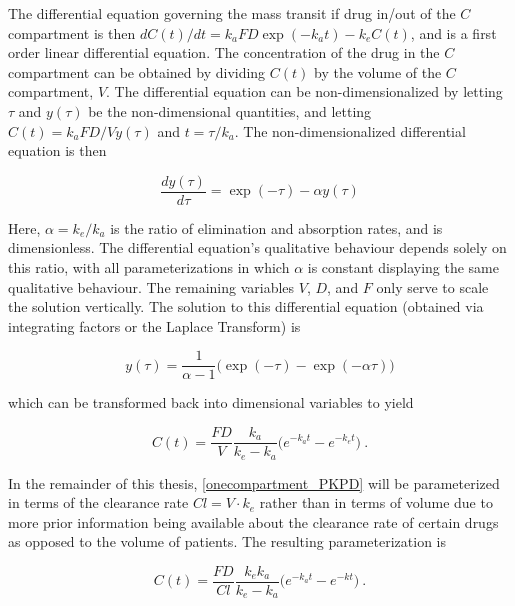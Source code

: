 The differential equation governing the mass transit if drug in/out of the $C$ compartment is then $dC(t)/dt = k_aFD\exp(-k_a t) - k_eC(t)$, and is a first order linear differential equation.  The concentration of the drug in the $C$ compartment can be obtained by dividing $C(t)$ by the volume of the $C$ compartment, $V$.  The differential equation can be non-dimensionalized by letting $\tau$ and $y(\tau)$ be the non-dimensional quantities, and letting $C(t) = k_a FD/V y(\tau)$ and $t = \tau/k_a$.  The non-dimensionalized differential equation is then

\begin{equation}
	\dfrac{dy(\tau)}{d\tau} = \exp(-\tau) - \alpha y(\tau)
\end{equation}

\noindent Here, $\alpha = k_e / k_a$ is the ratio of elimination and absorption rates, and is dimensionless.  The differential equation's qualitative behaviour depends solely on this ratio, with all parameterizations in which $\alpha$ is constant displaying the same qualitative behaviour.  The remaining variables $V$, $D$, and $F$ only serve to scale the solution vertically.  The solution to this differential equation (obtained via integrating factors or the Laplace Transform) is

\begin{equation}\label{key}
	y(\tau) = \dfrac{1}{\alpha -1} \Big( \exp(-\tau) - \exp(-\alpha \tau) \Big)
\end{equation}

\noindent which can be transformed back into dimensional variables to yield

\begin{equation}\label{onecompartment_PKPD}
	C(t) = \dfrac{F D}{V}\dfrac{k_a}{k_e - k_a}\Big(e^{-k_at} - e^{-k_et}\Big) \>.
\end{equation}

In the remainder of this thesis, \cref{onecompartment_PKPD} will be parameterized in terms of the clearance rate $Cl = V \cdot k_e$ rather than in terms of volume due to more prior information being available about the clearance rate of certain drugs as opposed to the volume of patients.  The resulting parameterization is

\begin{equation}\label{onecompartment_PKPD_cl}
	C(t) = \dfrac{F D}{Cl}\dfrac{k_ek_a}{k_e - k_a}\Big(e^{-k_at} - e^{-kt}\Big) \>.
\end{equation}

